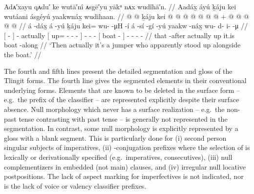 \ex\label{ex:intro-seg-gloss-jumper-stood-up}%
%
\begingl
	\glpreamble{}%
		Adᴀ′xayu qᴀdu′ ke wutā′nî ᴀsgē′yu yākᵘ nᴀx wudîhā′n. //
	\glpreamble{}%
		Aadáx̱ áyú ḵáju kei wutáani ásgéyú yaakwnáx̱ wudihaan. //
	\gla{}%
		{}  @ {} {}  @ {} 
		ḵáju
		{} kei @  @ {} @ {} @ {} {}
		 @ {} @ {} @ {} +
		{}  @ {} {}
		 @ {} @ {} @ {} @ {} //
	\glb{}%
		{} á -dáx̱ {} á -yú
		ḵáju
		{} kei= wu-  -μH -í {}
		á -sí -gí -yú
		{} yaakw -náx̱ {}
		wu- d- i-  -μ //
	\glc{}%
		{}[  - {}]  - 
		actually
		{}[ up= -  - - {}]
		 - - -
		{}[ boat - {}]
		- - -  - //
	\gld{}%
		{} that -after {}  {}
		actually
		{} up  {} {} {} {}
		it.is \· {} {}
		{} boat -along {}
		 {} {} {} {} //
	\glft{}%
		‘Then actually it’s a jumper who apparently stood up alongside the boat.’
		//
\endgl
\xe

The fourth and fifth lines present the detailed segmentation and gloss of the Tlingit forms.
The fourth line gives the segmented elements in their conventional underlying forms.
Elements that are known to be deleted in the surface form – e.g.\ the  prefix of the classifier – are represented explicitly despite their surface absence.
Null morphology which never has a surface realization – e.g.\ the non-past tense contrasting with past tense  – is generally not represented in the segmentation.
In contrast, some null morphology is explicitly represented by a gloss with a blank segment.
This is particularly done for (i) second person singular subjects of imperatives, (ii) -conjugation prefixes where the selection of  is lexically or derivationally specified (e.g.\ imperatives, consecutives), (iii) null complementizers in embedded (not main) clauses, and (iv) irregular null locative postpositions.
The lack of aspect marking for imperfectives is not indicated, nor is the lack of voice or valency classifier prefixes.


